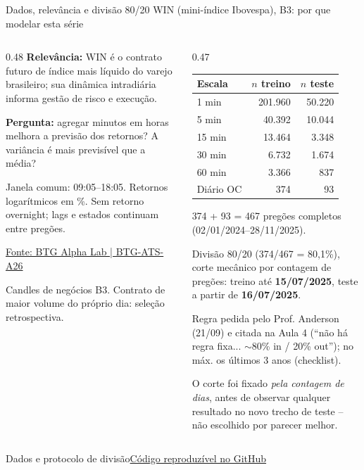 \documentclass[aspectratio=169,10pt]{beamer}
\newcommand{\source}[2]{\par\vfill{\raggedright\tiny\color{muted}#1\quad\href{#2}{Código reproduzível no GitHub}\par}}
\newcommand{\tagline}[1]{{\small\color{teal}#1}\par\medskip}
\begin{document}
\begin{frame}[t]{Dados, relevância e divisão 80/20}
\tagline{WIN (mini-índice Ibovespa), B3: por que modelar esta série}
\begin{columns}[T]\begin{column}{0.48\textwidth}
\textbf{Relevância:} WIN é o contrato futuro de índice mais líquido do varejo brasileiro; sua dinâmica intradiária informa gestão de risco e execução.\medskip\par
\textbf{Pergunta:} agregar minutos em horas melhora a previsão dos retornos? A variância é mais previsível que a média?\medskip\par
Janela comum: 09:05--18:05. Retornos logarítmicos em \%. \alert{Sem retorno overnight}; lags e estados continuam entre pregões.
\par\medskip\scriptsize\href{https://alphalab.btgpactual.com/datasets/publication:7a74b3ae-90e0-4393-b1e0-01e61c0bedba}{Fonte: BTG Alpha Lab | BTG-ATS-A26}\par Candles de negócios B3. Contrato de maior volume do próprio dia: seleção retrospectiva.\end{column}\begin{column}{0.47\textwidth}\centering\scriptsize
\begin{tabular}{lrr}
\toprule
Escala & $n$ treino & $n$ teste \\ \midrule
1 min & 201.960 & 50.220 \\
5 min & 40.392 & 10.044 \\
15 min & 13.464 & 3.348 \\
30 min & 6.732 & 1.674 \\
60 min & 3.366 & 837 \\
Diário OC & 374 & 93 \\
\bottomrule
\end{tabular}\par
\smallskip\scriptsize 374 + 93 = 467 pregões completos (02/01/2024--28/11/2025).\par\medskip
\raggedright\alert{Divisão 80/20 (374/467 = 80,1\%)}, corte mecânico por contagem de pregões: treino até \textbf{15/07/2025}, teste a partir de \textbf{16/07/2025}.\par\smallskip
Regra pedida pelo Prof. Anderson (21/09) e citada na Aula 4 (``não há regra fixa... $\sim$80\% in / 20\% out''); no máx. os últimos 3 anos (checklist).\par
\scriptsize O corte foi fixado \emph{pela contagem de dias}, antes de observar qualquer resultado no novo trecho de teste -- não escolhido por parecer melhor.\end{column}\end{columns}
\source{Dados e protocolo de divisão}{https://github.com/avilarenan/EAD6034/blob/main/src/ead6034/multiscale.py}
\end{frame}
\end{document}
